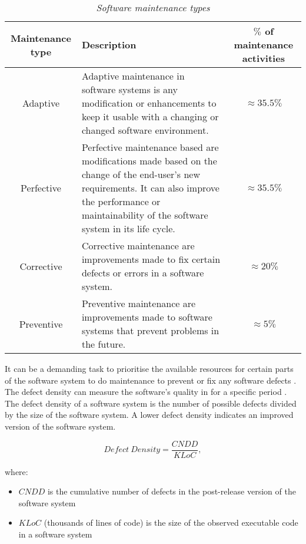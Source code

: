 \begin{table}[!htb]
	\centering
	\caption[Software maintenance types]
	{\textit{Software maintenance types \cite{Ping2010,Hasan2012,Mamone1994}}}
	\label{tbl:ch1_maintenanceTypes}
	\begin{tabularx}{\textwidth}{|c|X|c|}
		\hline
		\textbf{Maintenance type} & \textbf{Description} & \textbf{$\%$ of maintenance activities} \\ \hline
		Adaptive & \raggedright Adaptive maintenance in software systems is any modification or enhancements to keep it usable with a changing or changed software environment. & $\approx 35.5\%$ \\ \hline
		Perfective & \raggedright Perfective maintenance based are modifications made based on the change of the end-user's new requirements. It can also improve the performance or maintainability of the software system in its life cycle. & $\approx 35.5\%$ \\ \hline
		Corrective & \raggedright Corrective maintenance are improvements made to fix certain defects or errors in a software system. & $\approx 20\%$ \\ \hline
		Preventive & \raggedright  Preventive maintenance are improvements made to software systems that prevent problems in the future. & $\approx 5\%$ \\ \hline
	\end{tabularx}
\end{table}

It can be a demanding task to prioritise the available resources for certain parts of the software system to do maintenance to prevent or fix any software defects \cite{Mamone1994, Hasan2012}. The defect density can measure the software's quality in  for a specific period \cite{Shah2012, Alenezi2016}. The defect density of a software system is the number of possible defects divided by the size of the software system.  A lower defect density indicates an improved version of the software system.

\begin{equation}
	\label{eq:ch1_defectDensity}
	Defect~Density = \frac{CNDD}{KLoC},
\end{equation}

where:

\begin{itemize}
	\item $CNDD$ is the cumulative number of defects in the post-release version of the software system
	\item $KLoC$ (thousands of lines of code) is the size of the observed executable code in a software system 
\end{itemize}

